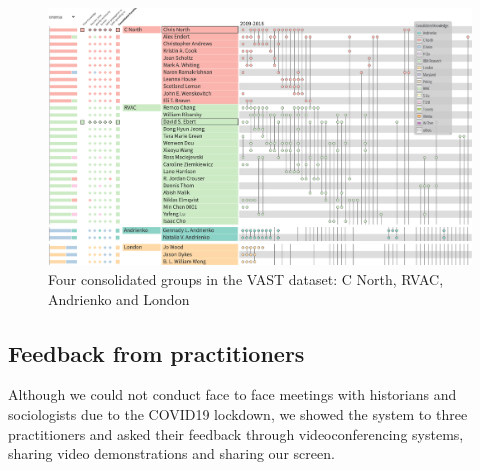 \begin{figure}[tb]
\centering
\includegraphics[width=\linewidth]{static/figures/PK-Clustering/VISPaperFigures/vast_some_consolidated_groups.png}
\caption{Four consolidated groups in the VAST dataset: C North, RVAC, Andrienko and London}
\label{fig:PK-vast_some_consolidated_groups}
\end{figure}

\subsection{Feedback from practitioners}

Although we could not conduct face to face meetings with historians and sociologists due to the COVID19 lockdown, we showed the system to three practitioners and asked their feedback through videoconferencing systems, sharing video demonstrations and sharing our screen.

